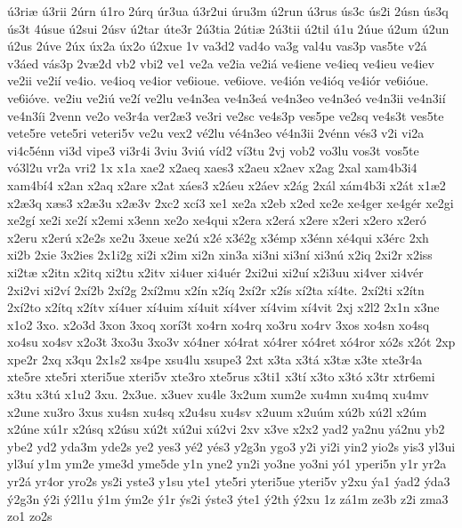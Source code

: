 {^^fa3ri^^e6
^^fa3rii
2^^farn
^^fa1ro
2^^farq
^^far3ua
^^fa3r2ui
^^faru3m
^^fa2run
^^fa3rus
^^fas3c
^^fas2i
2^^fasn
^^fas3q
^^fas3t
4^^fasue
^^fa2sui
2^^fasv
^^fa2tar
^^fate3r
2^^fa3tia
2^^fati^^e6
2^^fa3tii
^^fa2til
^^fa1u
2^^faue
^^fa2um
^^fa2un
^^fa2us
2^^fave
2^^fax
^^fax2a
^^fax2o
^^fa2xue
1v
va3d2
vad4o
va3g
val4u
vas3p
vas5te
v2^^e1
v3^^e1ed
v^^e1s3p
2v^^e62d
vb2
vbi2
ve1
ve2a
ve2ia
ve2i^^e1
ve4iene
ve4ieq
ve4ieu
ve4iev
ve2ii
ve2i^^ed
ve4io.
ve4ioq
ve4ior
ve6ioue.
ve6iove.
ve4i^^f3n
ve4i^^f3q
ve4i^^f3r
ve6i^^f3ue.
ve6i^^f3ve.
ve2iu
ve2i^^fa
ve2^^ed
ve2lu
ve4n3ea
ve4n3e^^e1
ve4n3eo
ve4n3e^^f3
ve4n3ii
ve4n3i^^ed
ve4n3^^edi
2venn
ve2o
ve3r4a
ver2^^e63
ve3ri
ve2sc
ve4s3p
ves5pe
ve2sq
ve4s3t
ves5te
vete5re
vete5ri
veteri5v
ve2u
vex2
v^^e92lu
v^^e94n3eo
v^^e94n3ii
2v^^e9nn
v^^e9s3
v2i
vi2a
vi4c5^^e9nn
vi3d
vipe3
vi3r4i
3viu
3vi^^fa
v^^edd2
v^^ed3tu
2vj
vob2
vo3lu
vos3t
vos5te
v^^f33l2u
vr2a
vri2
1x
x1a
xae2
x2aeq
xaes3
x2aeu
x2aev
x2ag
2xal
xam4b3i4
xam4b^^ed4
x2an
x2aq
x2are
x2at
x^^e1es3
x2^^e1eu
x2^^e1ev
x2^^e1g
2x^^e1l
x^^e1m4b3i
x2^^e1t
x1^^e62
x2^^e63q
x^^e6s3
x2^^e63u
x2^^e63v
2xc2
xc^^ed3
xe1
xe2a
x2eb
x2ed
xe2e
xe4ger
xe4g^^e9r
xe2gi
xe2g^^ed
xe2i
xe2^^ed
x2emi
x3enn
xe2o
xe4qui
x2era
x2er^^e1
x2ere
x2eri
x2ero
x2er^^f3
x2eru
x2er^^fa
x2e2s
xe2u
3xeue
xe2^^fa
x2^^e9
x3^^e92g
x3^^e9mp
x3^^e9nn
x^^e94qui
x3^^e9rc
2xh
xi2b
2xie
3x2ies
2x1i2g
xi2i
x2im
xi2n
xin3a
xi3ni
xi3n^^ed
xi3n^^fa
x2iq
2xi2r
x2iss
xi2t^^e6
x2itn
x2itq
xi2tu
x2itv
xi4uer
xi4u^^e9r
2xi2ui
xi2u^^ed
x2i3uu
xi4ver
xi4v^^e9r
2xi2vi
xi2v^^ed
2x^^ed2b
2x^^ed2g
2x^^ed2mu
x2^^edn
x2^^edq
2x^^ed2r
x2^^eds
x^^ed2ta
x^^ed4te.
2x^^ed2ti
x2^^edtn
2x^^ed2to
x2^^edtq
x2^^edtv
x^^ed4uer
x^^ed4uim
x^^ed4uit
x^^ed4ver
x^^ed4vim
x^^ed4vit
2xj
x2l2
2x1n
x3ne
x1o2
3xo.
x2o3d
3xon
3xoq
xor^^ed3t
xo4rn
xo4rq
xo3ru
xo4rv
3xos
xo4sn
xo4sq
xo4su
xo4sv
x2o3t
3xo3u
3xo3v
x^^f34ner
x^^f34rat
x^^f34rer
x^^f34ret
x^^f34ror
x^^f32s
x2^^f3t
2xp
xpe2r
2xq
x3qu
2x1s2
xs4pe
xsu4lu
xsupe3
2xt
x3ta
x3t^^e1
x3t^^e6
x3te
xte3r4a
xte5re
xte5ri
xteri5ue
xteri5v
xte3ro
xte5rus
x3ti1
x3t^^ed
x3to
x3t^^f3
x3tr
xtr6emi
x3tu
x3t^^fa
x1u2
3xu.
2x3ue.
x3uev
xu4le
3x2um
xum2e
xu4mn
xu4mq
xu4mv
x2une
xu3ro
3xus
xu4sn
xu4sq
x2u4su
xu4sv
x2uum
x2u^^fam
x^^fa2b
x^^fa2l
x2^^fam
x2^^fane
x^^fa1r
x2^^fasq
x2^^fasu
x^^fa2t
x^^fa2ui
x^^fa2vi
2xv
x3ve
x2x2
yad2
ya2nu
y^^e12nu
yb2
ybe2
yd2
yda3m
yde2s
ye2
yes3
y^^e92
y^^e9s3
y2g3n
ygo3
y2i
yi2i
yin2
yio2s
yis3
yl3ui
yl3u^^ed
y1m
ym2e
yme3d
yme5de
y1n
yne2
yn2i
yo3ne
yo3ni
y^^f31
yperi5n
y1r
yr2a
yr2^^e1
yr4or
yro2s
ys2i
yste3
y1su
yte1
yte5ri
yteri5ue
yteri5v
y2xu
^^fda1
^^fdad2
^^fdda3
^^fd2g3n
^^fd2i
^^fd2l1u
^^fd1m
^^fdm2e
^^fd1r
^^fds2i
^^fdste3
^^fdte1
^^fd2th
^^fd2xu
1z
z^^e11m
ze3b
z2i
zma3
zo1
zo2s
}
\egroup
